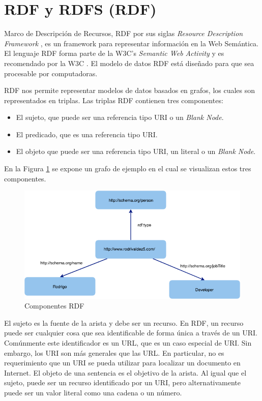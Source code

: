 \section{RDF y RDFS (RDF)}

Marco de Descripción de Recursos, RDF por sus siglas \textit{Resource Description Framework}  \cite{rdf}, es un framework para representar información en la Web Semántica. El lenguaje RDF forma parte de la W3C's \textit{Semantic Web Activity} y es recomendado por la W3C \cite{Semantic20:online}. El modelo de datos RDF está diseñado para que sea procesable por computadoras. 

RDF nos permite representar modelos de datos basados en grafos, los cuales son representados en triplas. Las triplas RDF contienen tres componentes:

\begin{itemize}
  \item El sujeto, que puede ser una referencia tipo URI o un \textit{Blank Node}.
  \item El predicado, que es una referencia tipo URI.
  \item El objeto que puede ser una referencia tipo URI, un literal o un \textit{Blank Node}.
\end{itemize}



En la Figura \ref{img:componentes rdf } se expone un grafo de ejemplo en el cual se visualizan estos tres componentes.

    \begin{figure}[ht!]
    \centering
    \includegraphics[width=150mm]{figuras/Diagramas-RDFGraph}
    \caption{Componentes RDF}
    \label{img:componentes rdf }
    \end{figure}
    
El sujeto es la fuente de la arista y debe ser un recurso. En RDF, un recurso puede ser cualquier cosa que sea identificable de forma única a través de un URI. Comúnmente este identificador es un URL, que es un caso especial de URI. Sin embargo, los URI son más generales que las URL. En particular, no es requerimiento que un URI se pueda utilizar para localizar un documento en Internet. El objeto de una sentencia es el objetivo de la arista. Al igual que el sujeto, puede ser un recurso identificado por un URI, pero alternativamente puede ser un valor literal como una cadena o un número. 

